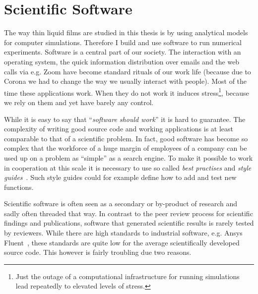 \section{Scientific Software}
\label{section:statement_software}
The way thin liquid films are studied in this thesis is by using analytical models for computer simulations.
Therefore I build and use software to run numerical experiments.
Software is a central part of our society.
The interaction with an operating system, the quick information distribution over emails and the web calls via e.g. Zoom have become standard rituals of our work life (because due to Corona we had to change the way we usually interact with people).
Most of the time these applications work.
When they do not work it induces stress\footnote{Just the outage of a computational infrastructure for running simulations lead repeatedly to elevated levels of stress.}, because we rely on them and yet have barely any control.

While it is easy to say that ``\textit{software should work}'' it is hard to guarantee.
The complexity of writing good source code and working applications is at least comparable to that of a scientific problem.
In fact, good software has become so complex that the workforce of a huge margin of employees of a company can be used up on a problem as ``simple'' as a search engine.
To make it possible to work in cooperation at this scale it is necessary to use so called \textit{best practises} and \textit{style guides}~\cite{sommerville2004software}.
Such style guides could for example define how to add and test new functions.

Scientific software is often seen as a secondary or by-product of research and sadly often threaded that way.
In contrast to the peer review process for scientific findings and publications, software that generated scientific results is rarely tested by reviewers.  
While there are high standards to industrial software, e.g. Ansys Fluent~\cite{matsson2020introduction}, these standards are quite low for the average scientifically developed source code.
This however is fairly troubling due two reasons.

